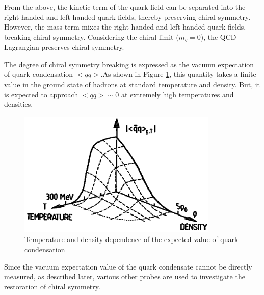         From the above, the kinetic term of the quark field can be separated into the right-handed and left-handed quark fields, thereby preserving chiral symmetry. However, the mass term mixes the right-handed and left-handed quark fields, breaking chiral symmetry. Considering the chiral limit ($m_q = 0$), the QCD Lagrangian preserves chiral symmetry.  
        
        The degree of chiral symmetry breaking is expressed as the vacuum expectation of quark condensation $< \bar{q}q >$.\@ As shown in Figure \ref{quark_condensate}\cite{Weise:1993ax}, this quantity takes a finite value in the ground state of hadrons at standard temperature and density. But, it is expected to approach $< \bar{q}q > \sim 0$ at extremely high temperatures and densities. 
        \begin{figure}[htbp]  
            \centering  
            \includegraphics[keepaspectratio, scale=0.6]{fig/1_1_quark_condensate.png}  
            \caption{Temperature and density dependence of the expected value of quark condensation}  
            \label{quark_condensate}  
        \end{figure}  
        Since the vacuum expectation value of the quark condensate cannot be directly measured, as described later, various other probes are used to investigate the restoration of chiral symmetry.
